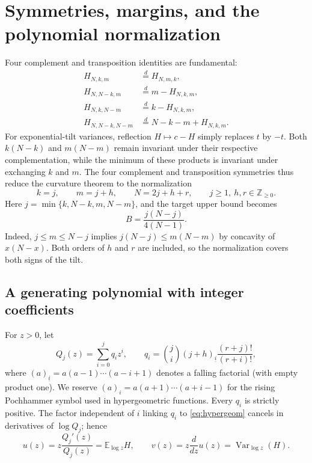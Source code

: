 \documentclass[11pt,a4paper]{article}
\DeclareMathOperator{\Var}{Var}\DeclareMathOperator{\Cov}{Cov}\DeclareMathOperator{\Hyp}{Hyp}\DeclareMathOperator{\Bern}{Bern}\DeclareMathOperator{\supp}{supp}\DeclareMathOperator{\artanh}{artanh}
\newcommand{\E}{\mathbb E}\newcommand{\R}{\mathbb R}\newcommand{\N}{\mathbb N}\newcommand{\one}{\mathbf1}
\begin{document}

\section{Symmetries, margins, and the polynomial normalization}\label{sec:reductions}
Four complement and transposition identities are fundamental:
\begin{align}
 H_{N,k,m}&\stackrel d=H_{N,m,k},\label{eq:sym1}\\
 H_{N,N-k,m}&\stackrel d=m-H_{N,k,m},\label{eq:sym2}\\
 H_{N,k,N-m}&\stackrel d=k-H_{N,k,m},\label{eq:sym3}\\
 H_{N,N-k,N-m}&\stackrel d=N-k-m+H_{N,k,m}.\label{eq:sym4}
\end{align}
For exponential-tilt variances, reflection $H\mapsto c-H$ simply replaces $t$ by $-t$. Both $k(N-k)$ and $m(N-m)$ remain invariant under their respective complementation, while the minimum of these products is invariant under exchanging $k$ and $m$. The four complement and transposition symmetries thus reduce the curvature theorem to the normalization
\begin{equation}\label{eq:param}
 k=j,\qquad m=j+h,\qquad N=2j+h+r,
 \qquad j\ge1,\ h,r\in\mathbb Z_{\ge0}.
\end{equation}
Here $j=\min\{k,N-k,m,N-m\}$, and the target upper bound becomes
\begin{equation}\label{eq:Bdef}
 B=\frac{j(N-j)}{4(N-1)}.
\end{equation}
Indeed, $j\le m\le N-j$ implies $j(N-j)\le m(N-m)$ by concavity of $x(N-x)$. Both orders of $h$ and $r$ are included, so the normalization covers both signs of the tilt.

\subsection{A generating polynomial with integer coefficients}
For $z>0$, let
\begin{equation}\label{eq:Q}
 Q_j(z)=\sum_{i=0}^j q_i z^i,
 \qquad
 q_i=\binom ji (j+h)_{\underline i}
 \frac{(r+j)!}{(r+i)!},
\end{equation}
where $(a)_{\underline i}=a(a-1)\cdots(a-i+1)$ denotes a falling factorial (with empty product one). We reserve $(a)_i=a(a+1)\cdots(a+i-1)$ for the rising Pochhammer symbol used in hypergeometric functions. Every $q_i$ is strictly positive. The factor independent of $i$ linking $q_i$ to \eqref{eq:hypergeom} cancels in derivatives of $\log Q_j$; hence
\begin{equation}\label{eq:tiltuv}
 u(z)=z\frac{Q_j'(z)}{Q_j(z)}=\E_{\log z}H,
 \qquad
 v(z)=z\frac{d}{dz}u(z)=\Var_{\log z}(H).
\end{equation}
\end{document}
